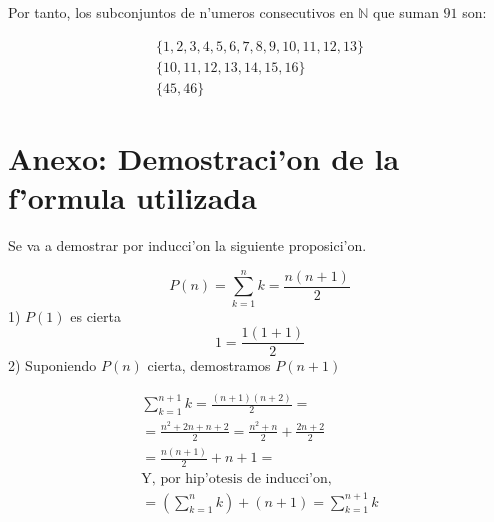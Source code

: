 \documentclass[12pt]{article}
\begin{document}
Por tanto, los subconjuntos de n'umeros consecutivos en $\mathbb{N}$ que suman $91$ son:

\begin{align*}
\{1,2,3,4,5,6,7,8,9,10,11,12,13\}\\
\{10, 11, 12, 13, 14, 15,16\}\\
\{45, 46\}
\end{align*}

\section*{Anexo: Demostraci'on de la f'ormula utilizada}
Se va a demostrar por inducci'on la siguiente proposici'on.

$$
P(n) = \sum_{k=1}^nk = \frac{n(n+1)}{2} 
$$
1) $P(1)$ es cierta
$$
     1 = \frac{1(1+1)}{2}
$$
2) Suponiendo $P(n)$ cierta, demostramos $P(n+1)$

\begin{align*}
	\sum_{k=1}^{n+1}k = \frac{(n+1)(n+2)}{2} = \\
	=\frac{n^2+2n+n+2}{2} = \frac{n^2+n}{2} + \frac{2n+2}{2} \\
	= \frac{n(n+1)}{2} + n+1 = \\
	 \text{Y, por hip'otesis de inducci'on,} \\
	 = \left(\sum_{k=1}^nk\right)+(n+1) =
	  \sum_{k=1}^{n+1}k
\end{align*}
\end{document}
